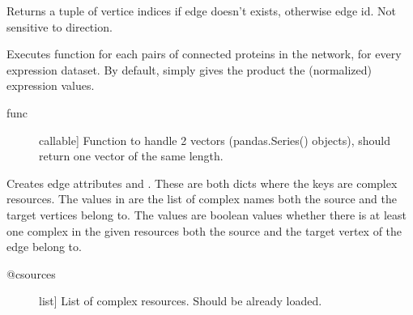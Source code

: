 \documentclass[letterpaper,10pt,english]{sphinxmanual}
\begin{document}
\begin{fulllineitems}
\begin{fulllineitems}
\begin{description}
\end{description}

\end{fulllineitems}


\begin{fulllineitems}
\label{\detokenize{main:pypath.main.PyPath.edge_exists}}
Returns a tuple of vertice indices if edge doesn’t exists,
otherwise edge id. Not sensitive to direction.

\end{fulllineitems}


\begin{fulllineitems}
\label{\detokenize{main:pypath.main.PyPath.edges_expression}}
Executes function  for each pairs of connected proteins in the
network, for every expression dataset. By default,  simply
gives the product the (normalized) expression values.
\begin{description}
\item[{func}] \leavevmode{[}callable{]}
Function to handle 2 vectors (pandas.Series() objects), should
return one vector of the same length.

\end{description}

\end{fulllineitems}


\begin{fulllineitems}
\label{\detokenize{main:pypath.main.PyPath.edges_in_comlexes}}
Creates edge attributes  and .
These are both dicts where the keys are complex resources.
The values in  are the list of complex names
both the source and the target vertices belong to.
The values  are boolean values whether there
is at least one complex in the given resources both the
source and the target vertex of the edge belong to.
\begin{description}
\item[{@csources}] \leavevmode{[}list{]}
List of complex resources. Should be already loaded.


\end{description}
\end{fulllineitems}
\end{fulllineitems}
\end{document}
